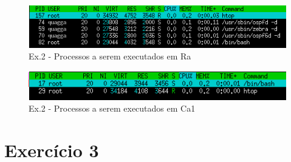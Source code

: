 \documentclass[a4paper]{report}
\begin{document}
\begin{figure}[H]
    \centering 
    \includegraphics[width=\textwidth]{images/htop2a.png}
    \caption{Ex.2 - Processos a serem executados em Ra}
    \label{fig:htop2a}
\end{figure}

\begin{figure}[H]
    \centering 
    \includegraphics[width=\textwidth]{images/htopca1.png}
    \caption{Ex.2 - Processos a serem executados em Ca1}
    \label{fig:htopca1}
\end{figure}

\pagebreak
\section{Exercício 3}
\end{document}
